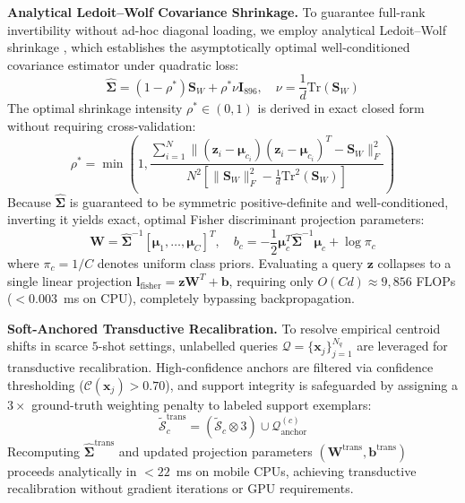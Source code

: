 \documentclass[conference]{IEEEtran}
\begin{document}
\textbf{Analytical Ledoit--Wolf Covariance Shrinkage.} To guarantee full-rank invertibility without ad-hoc diagonal loading, we employ analytical Ledoit--Wolf shrinkage \cite{ledoit2004well}, which establishes the asymptotically optimal well-conditioned covariance estimator under quadratic loss:
\begin{equation}
    \hat{\mathbf{\Sigma}} = (1 - \rho^*)\mathbf{S}_W + \rho^* \nu \mathbf{I}_{896}, \quad \nu = \frac{1}{d}\text{Tr}(\mathbf{S}_W)
\end{equation}
The optimal shrinkage intensity $\rho^* \in (0, 1)$ is derived in exact closed form without requiring cross-validation:
\begin{equation}
    \rho^* = \min\left(1, \frac{\sum_{i=1}^N \|(\mathbf{z}_i - \boldsymbol{\mu}_{c_i})(\mathbf{z}_i - \boldsymbol{\mu}_{c_i})^T - \mathbf{S}_W\|_F^2}{N^2 \left[\|\mathbf{S}_W\|_F^2 - \frac{1}{d}\text{Tr}^2(\mathbf{S}_W)\right]}\right)
\end{equation}
Because $\hat{\mathbf{\Sigma}}$ is guaranteed to be symmetric positive-definite and well-conditioned, inverting it yields exact, optimal Fisher discriminant projection parameters:
\begin{equation}
    \mathbf{W} = \hat{\mathbf{\Sigma}}^{-1} [\boldsymbol{\mu}_1, \dots, \boldsymbol{\mu}_C]^T, \quad b_c = -\frac{1}{2} \boldsymbol{\mu}_c^T \hat{\mathbf{\Sigma}}^{-1} \boldsymbol{\mu}_c + \log \pi_c
\end{equation}
where $\pi_c = 1/C$ denotes uniform class priors. Evaluating a query $\mathbf{z}$ collapses to a single linear projection $\mathbf{l}_{\text{fisher}} = \mathbf{z} \mathbf{W}^T + \mathbf{b}$, requiring only $O(Cd) \approx 9,856$ FLOPs ($<0.003$~ms on CPU), completely bypassing backpropagation.

\textbf{Soft-Anchored Transductive Recalibration.} To resolve empirical centroid shifts in scarce $5$-shot settings, unlabelled queries $\mathcal{Q} = \{\mathbf{x}_j\}_{j=1}^{N_q}$ are leveraged for transductive recalibration. High-confidence anchors are filtered via confidence thresholding ($\mathcal{C}(\mathbf{x}_j) > 0.70$), and support integrity is safeguarded by assigning a $3\times$ ground-truth weighting penalty to labeled support exemplars:
\begin{equation}
    \tilde{\mathcal{S}}_c^{\text{trans}} = (\tilde{\mathcal{S}}_c \otimes 3) \cup \mathcal{Q}_{\text{anchor}}^{(c)}
\end{equation}
Recomputing $\hat{\mathbf{\Sigma}}^{\text{trans}}$ and updated projection parameters $(\mathbf{W}^{\text{trans}}, \mathbf{b}^{\text{trans}})$ proceeds analytically in $<22$~ms on mobile CPUs, achieving transductive recalibration without gradient iterations or GPU requirements.
\end{document}
